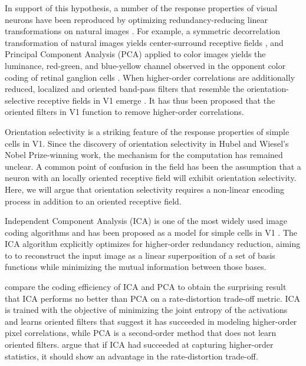 In support of this hypothesis, a number of the response properties of visual neurons have been reproduced by optimizing redundancy-reducing linear transformations on natural images \cite{atick1990towards}. For example, a symmetric decorrelation transformation of natural images yields center-surround receptive fields \cite{atick1990towards}, and Principal Component Analysis (PCA) applied to color images yields the luminance, red-green, and blue-yellow channel observed in the opponent color coding of retinal ganglion cells \cite{ruderman1998statistics, buchsbaum1983trichromacy}. When higher-order correlations are additionally reduced, localized and oriented band-pass filters that resemble the orientation-selective receptive fields in V1 emerge \cite{bell1997independent, olshausen1999probabilistic}. It has thus been proposed that the oriented filters in V1 function to remove higher-order correlations.

Orientation selectivity is a striking feature of the response properties of simple cells in V1. Since the discovery of orientation selectivity in Hubel and Wiesel's Nobel Prize-winning work, the mechanism for the computation has remained unclear. A common point of confusion in the field has been the assumption that a neuron with an locally oriented receptive field will exhibit orientation selectivity. Here, we will argue that orientation selectivity requires a non-linear encoding process in addition to an oriented receptive field.

Independent Component Analysis (ICA) is one of the most widely used image coding algorithms and has been proposed as a model for simple cells in V1 \cite{bell1997independent}. The ICA algorithm explicitly optimizes for higher-order redundancy reduction, aiming to to reconstruct the input image as a linear superposition of a set of basis functions while minimizing the mutual information between those bases.

 compare the  coding efficiency of ICA and PCA to obtain the surprising result that ICA performs no better than PCA on a rate-distortion trade-off metric. ICA is trained with the objective of minimizing the joint entropy of the activations and learns oriented filters that suggest it has succeeded in modeling higher-order pixel correlations, while PCA is a second-order method that does not learn oriented filters.  argue that if ICA had succeeded at capturing higher-order statistics, it should show an advantage in the rate-distortion trade-off.

